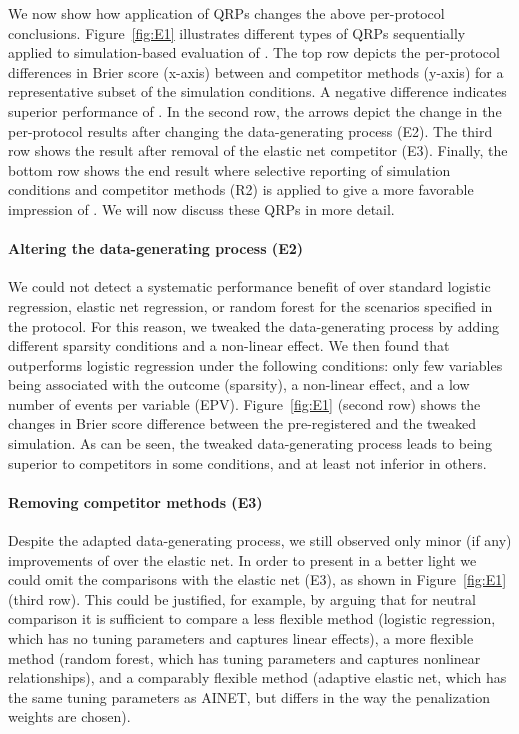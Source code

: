 \documentclass[a4paper, 11pt]{article}
\begin{document}
We now show how application of QRPs changes the above per-protocol conclusions.
Figure~\ref{fig:E1} illustrates different types of QRPs sequentially applied
to simulation-based evaluation of \ainet{}. The top row depicts the 
per-protocol differences in Brier score (x-axis) between \ainet{} and
competitor methods (y-axis) for a representative subset of the simulation
conditions. A negative difference indicates superior performance of \ainet{}.
In the second row, the arrows depict the change in the per-protocol
results after changing the data-generating process (E2). 
The third row shows the result after removal of the elastic net competitor 
(E3). Finally, the bottom row shows the end result where selective reporting 
of simulation conditions and competitor methods (R2) is applied to give 
a more favorable impression of \ainet{}.
We will now discuss these QRPs in more detail.

\paragraph{Altering the data-generating process (E2)}
We could not detect a systematic performance benefit
of \ainet{} over standard logistic regression, elastic net regression, or
random forest for the scenarios specified in the protocol. For this reason,
we tweaked the data-generating process by adding different sparsity conditions and a
non-linear effect. We then found that 
\ainet{} outperforms logistic regression under the following conditions: 
only few variables being associated with the
outcome (sparsity), a non-linear effect, and a low number of events per
variable (EPV). Figure~\ref{fig:E1} (second row) shows the changes in Brier score 
difference between the pre-registered and the tweaked simulation. As can be seen, the
tweaked data-generating process leads to \ainet{} being superior to competitors 
in some conditions, and at least not inferior in others. 

\paragraph{Removing competitor methods (E3)}
Despite the adapted data-generating process, we still observed only minor (if any)
improvements of \ainet{} over the elastic net. In order to present \ainet{} 
in a better light we could omit the comparisons with the elastic net (E3),
as shown in Figure~\ref{fig:E1} (third row). This could be justified, for example,
by arguing that for neutral comparison it is sufficient to compare a less flexible
method (logistic regression, which has no tuning parameters and captures linear
effects), a more flexible method (random forest, which has tuning parameters and
captures nonlinear relationships), and a comparably flexible method (adaptive
elastic net, which has the same tuning parameters as AINET, but differs in the
way the penalization weights are chosen).
\end{document}
